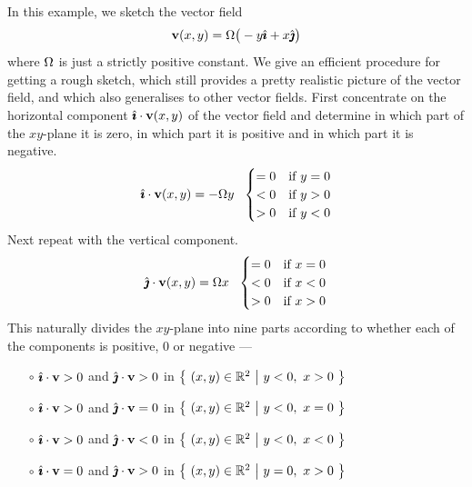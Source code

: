 \begin{eg}\label{eg:Vortex}
In this example, we sketch the vector field
\begin{equation*}
\mathbf{v}(x,y) = \Omega\big(-y\hat{\pmb{\imath}} +x\hat{\pmb{\jmath}}\big)
\end{equation*}
where $\Omega$ is just a strictly positive constant.
We give an efficient procedure for getting a rough sketch, which still
provides a pretty realistic picture of the vector field, and which also
generalises to other vector fields.
First concentrate
on the horizontal component $\hat{\pmb{\imath}}\cdot\mathbf{v}(x,y)$ of the vector field and 
determine in which part of the $xy$-plane it is zero, in which part 
it is positive and in which part it is negative.
\begin{equation*}
\hi\cdot\vv(x,y)
=-\Om y\ \ 
\begin{cases}
   =0 &\text{if $y=0$}\\
   <0 &\text{if $y>0$}\\
   >0 &\text{if $y<0$}
\end{cases}
\end{equation*}
Next repeat with the vertical component.
\begin{equation*}
\hj\cdot\vv(x,y)
= \Om x\ \ 
\begin{cases}
   =0 &\text{if $x=0$}\\
   <0 &\text{if $x<0$}\\
   >0 &\text{if $x>0$}
\end{cases}
\end{equation*}
This naturally divides the $xy$-plane into nine parts according to whether
each of the components is positive, $0$ or negative --- 
\begin{itemize}\itemsep1pt \parskip0pt \parsep0pt %
\item[$\circ$]
$\hat{\pmb{\imath}}\cdot\mathbf{v}>0$ and $\hat{\pmb{\jmath}}\cdot\mathbf{v}>0$
in $\big\{\ (x,y)\in\bbbr^2\ \big|\  y<0,\ x>0\ \big\}$ 
\item[$\circ$]
$\hat{\pmb{\imath}}\cdot\mathbf{v}>0$ and $\hat{\pmb{\jmath}}\cdot\mathbf{v}=0$
in $\big\{\ (x,y)\in\bbbr^2\ \big|\  y<0,\ x=0\ \big\}$ 
\item[$\circ$]
$\hat{\pmb{\imath}}\cdot\mathbf{v}>0$ and $\hat{\pmb{\jmath}}\cdot\mathbf{v}<0$
in $\big\{\ (x,y)\in\bbbr^2\ \big|\  y<0,\ x<0\ \big\}$ 
\item[$\circ$]
$\hat{\pmb{\imath}}\cdot\mathbf{v}=0$ and $\hat{\pmb{\jmath}}\cdot\mathbf{v}>0$
in $\big\{\ (x,y)\in\bbbr^2\ \big|\  y=0,\ x>0\ \big\}$ 

\end{itemize}
\end{eg}
